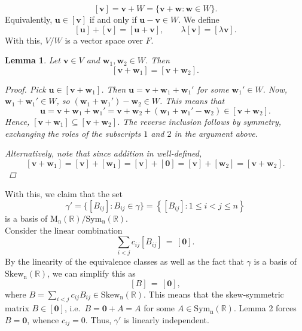 \documentclass[10pt]{article}
\def\MnR{\operatorname{M_n(\mathbb{R})}}
\def\Sym{\operatorname{Sym_n(\mathbb{R})}}
\def\Skew{\operatorname{Skew_n(\mathbb{R})}}
\def\u{\bm{u}}
\def\v{\bm{v}}
\def\w{\bm{w}}
\newtheorem{lemma}{Lemma}
\begin{document}
        \[
                [\v] = \v + W = \{\v + \w\colon \w \in W\}.
        \]
        Equivalently, $\u \in [\v]$ if and only if $\u - \v \in W$.
        We define
        \[
                [\u] + [\v] = [\u + \v], \qquad \lambda[\v] = [\lambda\v].
        \]
        With this, $V/W$ is a vector space over $F$.
        \begin{lemma}
                Let $\v \in V$ and $\w_1, \w_2 \in W$. Then
                \[
                        [\v + \w_1] = [\v + \w_2].
                \]
                \begin{proof}
                        Pick $\u \in [\v + \w_1]$. Then $\u = \v + \w_1 + \w_1'$ for some $\w_1' \in W$. Now, $\w_1 + \w_1' \in W$,
                        so $(\w_1 + \w_1') - \w_2 \in W$. This means that
                        \[
                                \u = \v + \w_1 + \w_1' = \v + \w_2 + (\w_1 + \w_1' - \w_2) \in [\v + \w_2].
                        \]
                        Hence, $[\v + \w_1] \subseteq [\v + \w_2]$.
                        The reverse inclusion follows by symmetry, exchanging the roles of the subscripts $1$ and $2$ in the argument above. \\ \qedhere

                        Alternatively, note that since addition in well-defined,
                        \[
                                [\v + \w_1] = [\v] + [\w_1] = [\v] + [\mathbf{0}] = [\v] + [\w_2] = [\v + \w_2].
                        \]
                \end{proof}
        \end{lemma}

        With this, we claim that the set 
        \[
                \gamma' = \{[B_{ij}]\colon B_{ij} \in \gamma\} = \left\{[B_{ij}]\colon 1 \leq i < j \leq n\right\}
        \]
        is a basis of $\MnR/\Sym$. \\

        Consider the linear combination
        \[
                \sum_{i < j} c_{ij} [B_{ij}] \,=\, [\mathbf{0}].
        \]
        By the linearity of the equivalence classes as well as the fact that $\gamma$ is a basis of $\Skew$, we can simplify this as
        \[
                [B] \,=\, [\mathbf{0}],
        \]
        where $B = \sum_{i < j} c_{ij} B_{ij} \in \Skew$.
        This means that the skew-symmetric matrix $B \in [\mathbf{0}]$, i.e.\ $B = \mathbf{0} + A = A$ for some $A \in \Sym$.
        Lemma 2 forces $B = \mathbf{0}$, whence $c_{ij} = 0$. Thus, $\gamma'$ is linearly independent. \\
        
\end{document}
